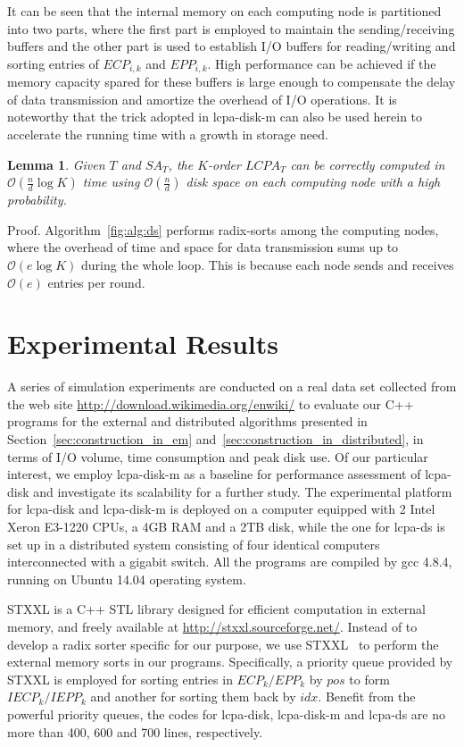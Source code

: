 \documentclass[10pt,journal,compsoc]{IEEEtran}
\newtheorem{Lemma}{Lemma}
\begin{document}
\begin{CJK*}{GBK}{song}
It can be seen that the internal memory on each computing node is partitioned into two parts, where the first part is employed to maintain the sending/receiving buffers and the other part is used to establish I/O buffers for reading/writing and sorting entries of $ECP_{i,k}$ and $EPP_{i,k}$. High performance can be achieved if the memory capacity spared for these buffers is large enough to compensate the delay of data transmission and amortize the overhead of I/O operations. It is noteworthy that the trick adopted in lcpa-disk-m can also be used herein to accelerate the running time with a growth in storage need.

\begin{Lemma}
\label{thm:lcp:pdm}
Given $T$ and $SA_T$, the $K$-order $LCPA_T$ can be correctly computed in $\mathcal{O}(\frac{n}{d}\log K)$ time using $\mathcal{O}(\frac{n}{d})$ disk space on each computing node with a high probability.
\end{Lemma}
Proof. Algorithm~\ref{fig:alg:ds} performs radix-sorts among the computing nodes, where the overhead of time and space for data transmission sums up to $\mathcal{O}(e\log K)$ during the whole loop. This is because each node sends and receives $\mathcal{O}(e)$ entries per round.



\section{Experimental Results}\label{sec:experimental_results}

A series of simulation experiments are conducted on a real data set collected from the web site \url{http://download.wikimedia.org/enwiki/} to evaluate our {C++} programs for the external and distributed algorithms presented in Section~\ref{sec:construction_in_em} and~\ref{sec:construction_in_distributed}, in terms of I/O volume, time consumption and peak disk use. Of our particular interest, we employ lcpa-disk-m as a baseline for performance assessment of lcpa-disk and investigate its scalability for a further study. The experimental platform for lcpa-disk and lcpa-disk-m is deployed on a computer equipped with 2 Intel Xeron E3-1220 CPUs, a 4GB RAM and a 2TB disk, while the one for lcpa-ds is set up in a distributed system consisting of four identical computers interconnected with a gigabit switch. All the programs are compiled by gcc 4.8.4, running on Ubuntu 14.04 operating system.

STXXL is a {C++} STL library designed for efficient computation in external memory, and freely available at \url{http://stxxl.sourceforge.net/}. Instead of to develop a radix sorter specific for our purpose, we use STXXL~\cite{Dementiev2007} to perform the external memory sorts in our programs. Specifically, a priority queue  provided by STXXL is employed for sorting entries in $ECP_k/EPP_k$ by $pos$ to form $IECP_k/IEPP_k$ and another for sorting them back by $idx$. Benefit from the powerful priority queues, the codes for lcpa-disk, lcpa-disk-m and lcpa-ds are no more than 400, 600 and 700 lines, respectively.


\end{CJK*}
\end{document}

